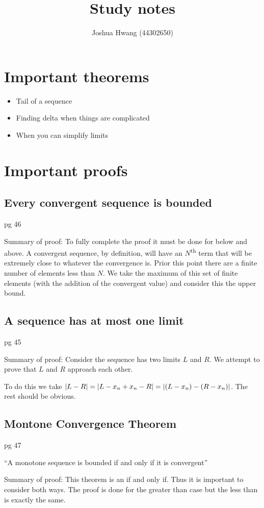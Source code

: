 \documentclass{article}
\title{Study notes}
\author{Joshua Hwang (44302650)}
\newcommand{\ts}{\textsuperscript}
\DeclarePairedDelimiter{\abs}{\lvert}{\rvert}
\begin{document}
\maketitle

\section{Important theorems}
\begin{itemize}
    \item Tail of a sequence
    \item Finding delta when things are complicated
    \item When you can simplify limits
\end{itemize}
\section{Important proofs}
\subsection{Every convergent sequence is bounded}
pg 46

Summary of proof: To fully complete the proof it must be done for below and
above.
A convergent sequence, by definition, will have an $N$\ts{th}
term that will be extremely close to whatever the convergence is.
Prior this point there are a finite number of elements less than $N$. We take
the maximum of this set of finite elements (with the addition of the
convergent value) and consider this the upper bound.

\subsection{A sequence has at most one limit}
pg 45

Summary of proof: Consider the sequence has two limits $L$ and $R$.
We attempt to prove that $L$ and $R$ approach each other.

To do this we take
$\abs*{L - R} = \abs*{L - x_n + x_n - R} = \abs*{(L - x_n) - (R - x_n)}$. The
rest should be obvious.

\subsection{Montone Convergence Theorem}
pg 47

``A monotone sequence is bounded if and only if it is convergent''

Summary of proof: This theorem is an if and only if. Thus it is important to
consider both ways. The proof is done for the greater than case but the less
than is exactly the same.
\end{document}
